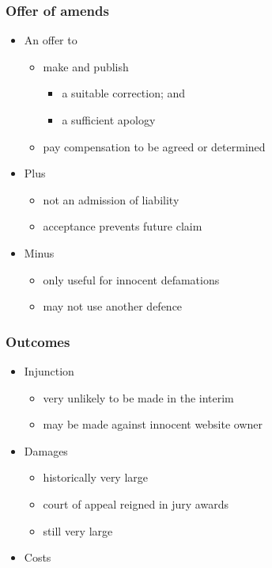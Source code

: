 \documentclass[ignorenonframetext,]{beamer}
\begin{document}
\begin{frame}
\frametitle{Offer of amends}

\begin{itemize}
\item  An offer to

  \begin{itemize}
  \item    make and publish

    \begin{itemize}
    \item a suitable correction; and
    \item a sufficient apology
    \end{itemize}
  \item    {pay }{compensation to be agreed or determined}
  \end{itemize}
\item  {Plus}

  \begin{itemize}
  \item    {not an admission of liability}
  \item    {acceptance prevents future claim}
  \end{itemize}
\item  {Minus}

  \begin{itemize}
  \item    {only useful for innocent defamations}
  \item    {may not use another defence}
  \end{itemize}
\end{itemize}

\end{frame}

\begin{frame}
\frametitle{Outcomes}

\begin{itemize}
\item  Injunction
  \begin{itemize}
  \item very unlikely to be  made in the interim
  \item may be made against innocent website owner
  \end{itemize}
\item  Damages

  \begin{itemize}
  \item historically very large
  \item court of appeal reigned in jury awards
  \item still very large
  \end{itemize}
\item  Costs
\end{itemize}
\end{frame}
\end{document}

